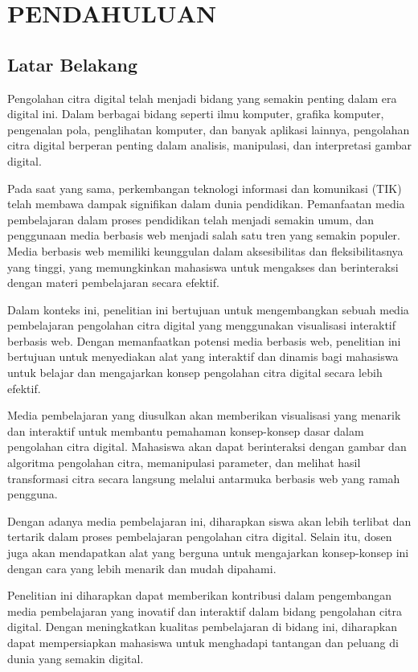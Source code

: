 \chapter{PENDAHULUAN}

\section{Latar Belakang}
Pengolahan citra digital telah menjadi bidang yang semakin penting dalam era digital ini. Dalam berbagai bidang seperti ilmu komputer, grafika komputer, pengenalan pola, penglihatan komputer, dan banyak aplikasi lainnya, pengolahan citra digital berperan penting dalam analisis, manipulasi, dan interpretasi gambar digital.

Pada saat yang sama, perkembangan teknologi informasi dan komunikasi (TIK) telah membawa dampak signifikan dalam dunia pendidikan. Pemanfaatan media pembelajaran dalam proses pendidikan telah menjadi semakin umum, dan penggunaan media berbasis web menjadi salah satu tren yang semakin populer. Media berbasis web memiliki keunggulan dalam aksesibilitas dan fleksibilitasnya yang tinggi, yang memungkinkan mahasiswa untuk mengakses dan berinteraksi dengan materi pembelajaran secara efektif.

Dalam konteks ini, penelitian ini bertujuan untuk mengembangkan sebuah media pembelajaran pengolahan citra digital yang menggunakan visualisasi interaktif berbasis web. Dengan memanfaatkan potensi media berbasis web, penelitian ini bertujuan untuk menyediakan alat yang interaktif dan dinamis bagi mahasiswa untuk belajar dan mengajarkan konsep pengolahan citra digital secara lebih efektif.

Media pembelajaran yang diusulkan akan memberikan visualisasi yang menarik dan interaktif untuk membantu pemahaman konsep-konsep dasar dalam pengolahan citra digital. Mahasiswa akan dapat berinteraksi dengan gambar dan algoritma pengolahan citra, memanipulasi parameter, dan melihat hasil transformasi citra secara langsung melalui antarmuka berbasis web yang ramah pengguna.

Dengan adanya media pembelajaran ini, diharapkan siswa akan lebih terlibat dan tertarik dalam proses pembelajaran pengolahan citra digital. Selain itu, dosen juga akan mendapatkan alat yang berguna untuk mengajarkan konsep-konsep ini dengan cara yang lebih menarik dan mudah dipahami.

Penelitian ini diharapkan dapat memberikan kontribusi dalam pengembangan media pembelajaran yang inovatif dan interaktif dalam bidang pengolahan citra digital. Dengan meningkatkan kualitas pembelajaran di bidang ini, diharapkan dapat mempersiapkan mahasiswa untuk menghadapi tantangan dan peluang di dunia yang semakin digital.

